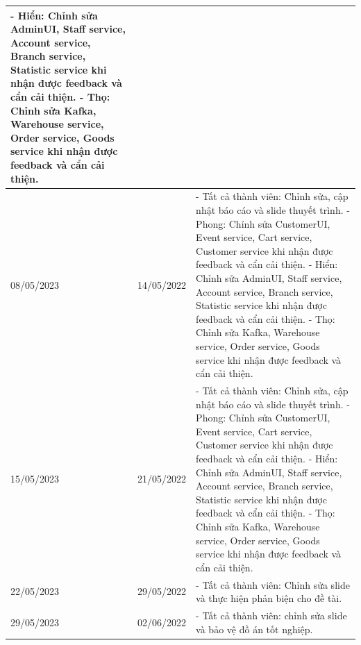 \begin{longtable}{| p{2cm} | p{2cm} | p{10cm} |}
    - Hiển: Chỉnh sửa AdminUI, Staff service, Account service, Branch service, Statistic service khi nhận được feedback và cẩn cải thiện. 
    \newline
    - Thọ: Chỉnh sửa Kafka, Warehouse service, Order service, Goods service khi nhận được feedback và cẩn cải thiện. \\
	\hline
	08/05/2023 & 14/05/2022 & 
    - Tất cả thành viên: Chỉnh sửa, cập nhật báo cáo và slide thuyết trình.
    \newline
    - Phong: Chỉnh sửa CustomerUI, Event service, Cart service, Customer service khi nhận được feedback và cẩn cải thiện. 
    \newline
    - Hiển: Chỉnh sửa AdminUI, Staff service, Account service, Branch service, Statistic service khi nhận được feedback và cẩn cải thiện. 
    \newline
    - Thọ: Chỉnh sửa Kafka, Warehouse service, Order service, Goods service khi nhận được feedback và cẩn cải thiện. \\
	\hline
	15/05/2023 & 21/05/2022 & 
    - Tất cả thành viên: Chỉnh sửa, cập nhật báo cáo và slide thuyết trình.
    \newline
    - Phong: Chỉnh sửa CustomerUI, Event service, Cart service, Customer service khi nhận được feedback và cẩn cải thiện. 
    \newline
    - Hiển: Chỉnh sửa AdminUI, Staff service, Account service, Branch service, Statistic service khi nhận được feedback và cẩn cải thiện. 
    \newline
    - Thọ: Chỉnh sửa Kafka, Warehouse service, Order service, Goods service khi nhận được feedback và cẩn cải thiện. \\
	\hline
	22/05/2023 & 29/05/2022 & 
    - Tất cả thành viên: Chỉnh sửa slide và thực hiện phản biện cho đề tài. \\
	\hline
	29/05/2023 & 02/06/2022 & 
    - Tất cả thành viên: chỉnh sửa slide và bảo vệ đồ án tốt nghiệp. \\
	\hline

\end{longtable}

